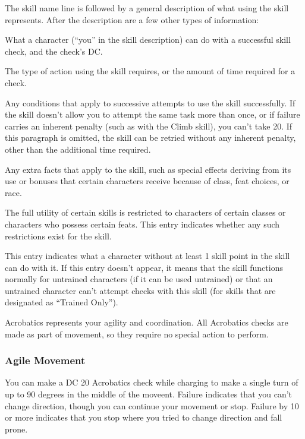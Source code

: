 \par The skill name line is followed by a general description of what using the skill represents. After the description are a few other types of information:

 What a character (``you'' in the skill description) can do with a successful skill check, and the check's DC.

 The type of action using the skill requires, or the amount of time required for a check.

 Any conditions that apply to successive attempts to use the skill successfully. If the skill doesn't allow you to attempt the same task more than once, or if failure carries an inherent penalty (such as with the Climb skill), you can't take 20. If this paragraph is omitted, the skill can be retried without any inherent penalty, other than the additional time required.

 Any extra facts that apply to the skill, such as special effects deriving from its use or bonuses that certain characters receive because of class, feat choices, or race.

 The full utility of certain skills is restricted to characters of certain classes or characters who possess certain feats. This entry indicates whether any such restrictions exist for the skill.

 This entry indicates what a character without at least 1 skill point in the skill can do with it. If this entry doesn't appear, it means that the skill functions normally for untrained characters (if it can be used untrained) or that an untrained character can't attempt checks with this skill (for skills that are designated as ``Trained Only'').

Acrobatics represents your agility and coordination. All Acrobatics checks are made as part of movement, so they require no special action to perform.

\subsubsection{Agile Movement}
You can make a DC 20 Acrobatics check while charging to make a single turn of up to 90 degrees in the middle of the moveent. Failure indicates that you can't change direction, though you can continue your movement or stop. Failure by 10 or more indicates that you stop where you tried to change direction and fall prone.

